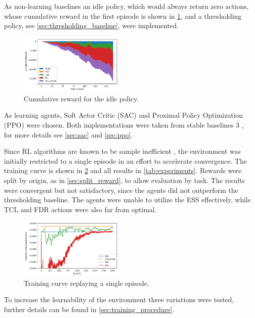 As non-learning baselines an idle policy, which would always return zero actions, whose cumulative reward in the first episode is shown in \cref{fig:reward_idle}, and a thresholding policy, see \cref{sec:thresholding_baseline}, were implemented.

\begin{figure}[H]
    \centering
    \includegraphics[width=0.45\textwidth]{figures/idle_reward.png}
    \caption{Cumulative reward for the idle policy.}
    \label{fig:reward_idle}
\end{figure}

As learning agents, Soft Actor Critic (SAC) \cite{Haarnoja.04.01.2018} and Proximal Policy Optimization (PPO) \cite{Schulman.20.07.2017} were chosen. Both implementations were taken from stable baselines 3 \cite{AntoninRaffin.2021}, for more details see \cref{sec:sac} and \cref{sec:ppo}.
\par
Since RL algorithms are known to be sample inefficient \cite{rlblogpost}, the environment was initially restricted to a single episode in an effort to accelerate convergence. The training curve is shown in \cref{fig:training_curve} and all results in \cref{tab:experiments}. Rewards were split by origin, as in \cref{sec:split_reward}, to allow evaluation by task. The results were convergent but not satisfactory, since the agents did not outperform the thresholding baseline. The agents were unable to utilize the ESS effectively, while TCL and FDR actions were also far from optimal.
\begin{figure}[H]
    \centering
    \setlength{\abovecaptionskip}{0pt}
    \includegraphics[width=0.45\textwidth]{figures/training_curve.png}
    \caption{Training curve replaying a single episode.}
    \label{fig:training_curve}
\end{figure}
To increase the learnability of the environment three variations were tested, further details can be found in \cref{sec:training_procedure}.


